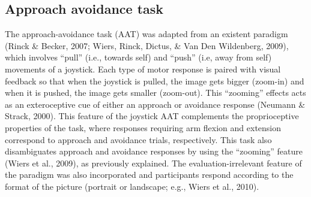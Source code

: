 \documentclass[man,floatsintext]{apa6}
\begin{document}
\hypertarget{aat}{%
\subsection{Approach avoidance task}\label{aat}}

\par

The approach-avoidance task (AAT) was adapted from an existent paradigm (Rinck \& Becker, 2007; Wiers, Rinck, Dictus, \& Van Den Wildenberg, 2009), which involves \enquote{pull} (i.e., towards self) and \enquote{push} (i.e, away from self) movements of a joystick. Each type of motor response is paired with visual feedback so that when the joystick is pulled, the image gets bigger (zoom-in) and when it is pushed, the image gets smaller (zoom-out). This \enquote{zooming} effects acts as an exteroceptive cue of either an approach or avoidance response (Neumann \& Strack, 2000). This feature of the joystick AAT complements the proprioceptive properties of the task, where responses requiring arm flexion and extension correspond to approach and avoidance trials, respectively. This task also disambiguates approach and avoidance responses by using the \enquote{zooming} feature (Wiers et al., 2009), as previously explained. The evaluation-irrelevant feature of the paradigm was also incorporated and participants respond according to the format of the picture (portrait or landscape; e.g., Wiers et al., 2010).

\par
\end{document}
